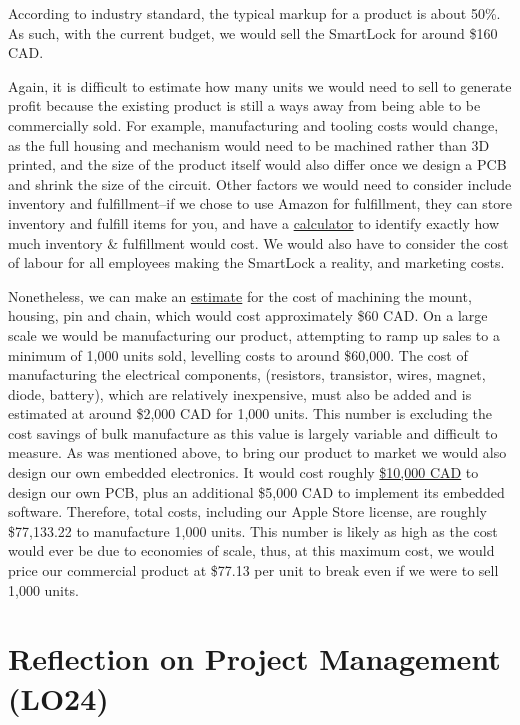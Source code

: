 \documentclass{article}
\begin{document}
According to industry standard, the typical markup for a product is about 50\%. As such, with the current budget, we would sell the SmartLock for around \$160 CAD. 

Again, it is difficult to estimate how many units we would need to sell to generate profit because the existing product is still a ways away from being able to be commercially sold. For example, manufacturing and tooling costs would change, as the full housing and mechanism would need to be machined rather than 3D printed, and the size of the product itself would also differ once we design a PCB and shrink the size of the circuit. Other factors we would need to consider include inventory and fulfillment--if we chose to use Amazon for fulfillment, they can store inventory and fulfill items for you, and have a \href{https://sellercentral.amazon.com/fba/profitabilitycalculator/index?lang=en_CA}{calculator} to identify exactly how much inventory \& fulfillment would cost. We would also have to consider the cost of labour for all employees making the SmartLock a reality, and marketing costs. 

Nonetheless, we can make an \href{https://extremeengines.ca/machine-shop-price-list}{estimate} for the cost of machining the mount, housing, pin and chain, which would cost approximately \$60 CAD. On a large scale we would be manufacturing our product, attempting to ramp up sales to a minimum of 1,000 units sold, levelling costs to around \$60,000.  The cost of manufacturing the electrical components, (resistors, transistor, wires, magnet, diode, battery), which are relatively inexpensive, must also be added and is estimated at around \$2,000 CAD for 1,000 units. This number is excluding the cost savings of bulk manufacture as this value is largely variable and difficult to measure. As was mentioned above, to bring our product to market we would also design our own embedded electronics. It would cost roughly \href{https://www.cadcrowd.com/blog/cost-to-design-a-new-electronic-product-develop-pcb-hardware-prototype-rates-at-firms/#software-estimated-cost-5000}{\$10,000 CAD} to design our own PCB, plus an additional \$5,000 CAD to implement its embedded software. Therefore, total costs, including our Apple Store license, are roughly \$77,133.22 to manufacture 1,000 units. This number is likely as high as the cost would ever be due to economies of scale, thus, at this maximum cost, we would price our commercial product at \$77.13 per unit to break even if we were to sell 1,000 units. 

\section{Reflection on Project Management (LO24)}
\end{document}
